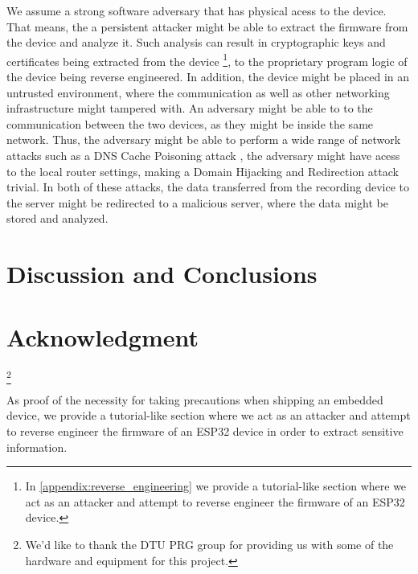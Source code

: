 \documentclass[conference]{IEEEtran}
\begin{document}
We assume a strong software adversary that has physical acess to the device.
That means, the a persistent attacker might be able to extract the firmware from the device and
analyze it. Such analysis can result in cryptographic keys and certificates being extracted from the device
\footnote{In \cref{appendix:reverse_engineering} we provide a tutorial-like section where we act as an attacker and attempt to reverse engineer the firmware of an ESP32 device.}, 
to the proprietary program logic of the device being reverse engineered.
In addition, the device might be placed in an untrusted environment, where the communication as well 
as other networking infrastructure might tampered with.
An adversary might be able to  to the communication between the two devices,
as they might be inside the same network.
Thus, the adversary might be able to perform a wide range of network attacks such 
as a DNS Cache Poisoning attack \cite{Dissanayake_2018}, the adversary might have acess to the local router 
settings, making a Domain Hijacking and Redirection attack \cite{DnsHijacking} trivial. In both of these attacks, 
the data transferred from the recording device to the server might be redirected to a malicious server, 
where the data might be stored and analyzed.

\section{Discussion and Conclusions}
\label{sec:discussion_and_conclusions}

\section*{Acknowledgment}

\thanks{We'd like to thank the DTU PRG group for providing us with some of the hardware and equipment for this project.}




\appendices
{}

\label{appendix:reverse_engineering}

As proof of the necessity for taking precautions when shipping an embedded device, 
we provide a tutorial-like section where we act as an attacker and attempt to reverse engineer the firmware of an ESP32
device in order to extract sensitive information.
\end{document}
